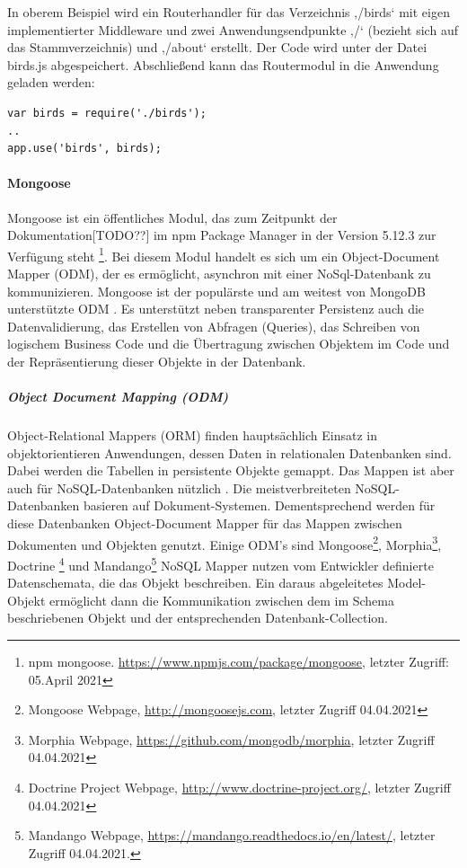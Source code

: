 \noindent
In oberem Beispiel wird ein Routerhandler für das Verzeichnis ‚/birds‘ mit eigen implementierter Middleware und zwei Anwendungsendpunkte ‚/‘ (bezieht sich auf das Stammverzeichnis) und ‚/about‘ erstellt. Der Code wird unter der Datei birds.js abgespeichert. 
Abschließend kann das Routermodul in die Anwendung geladen werden: 
\newline

\begin{lstlisting}[caption=Routinghandler benutzen,label=lst:RoutingHandlerUsage]
var birds = require('./birds');
..
app.use('birds', birds);
\end{lstlisting}

%
%
%

\newpage
\paragraph{Mongoose}
Mongoose ist ein öffentliches Modul, das zum Zeitpunkt der Dokumentation[TODO??] im npm Package Manager in der Version 5.12.3 zur Verfügung steht \footnote{npm mongoose. \url{https://www.npmjs.com/package/mongoose}, letzter Zugriff: 05.April 2021}. Bei diesem Modul handelt es sich um ein Object-Document Mapper (ODM), der es ermöglicht, asynchron mit einer NoSql-Datenbank zu kommunizieren. Mongoose ist der populärste und am weitest von MongoDB unterstützte ODM \cite{Node2.55}. Es unterstützt neben transparenter Persistenz auch die Datenvalidierung, das Erstellen von Abfragen (Queries), das Schreiben von logischem Business Code und die Übertragung zwischen Objektem im Code und der Repräsentierung dieser Objekte in der Datenbank.
\newline

%
%
%

\noindent
\subparagraph{Object Document Mapping (ODM)}
Object-Relational Mappers (ORM) finden haupt\-sächlich Einsatz in objektorientieren Anwendungen, dessen Daten in relationalen Datenbanken sind. Dabei werden die Tabellen in persistente Objekte gemappt.
Das Mappen ist aber auch für NoSQL-Datenbanken nützlich \cite{Node2.56}. Die meistverbreiteten NoSQL-Datenbanken basieren auf Dokument-Systemen. Dementsprechend werden für diese Datenbanken Object-Document Mapper für das Mappen zwischen Dokumenten und Objekten genutzt. Einige ODM’s sind Mongoose\footnote{Mongoose Webpage, \url{http://mongoosejs.com}, letzter Zugriff 04.04.2021}, Morphia\footnote{Morphia Webpage, \url{https://github.com/mongodb/morphia}, letzter Zugriff 04.04.2021}, Doctrine \footnote{Doctrine Project Webpage, \url{http://www.doctrine-project.org/}, letzter Zugriff 04.04.2021} und Mandango\footnote{Mandango Webpage, \url{https://mandango.readthedocs.io/en/latest/}, letzter Zugriff 04.04.2021.}
NoSQL Mapper nutzen vom Entwickler definierte Datenschemata, die das Objekt beschreiben. Ein daraus abgeleitetes Model-Objekt ermöglicht dann die Kommunikation zwischen dem im Schema beschriebenen Objekt und der entsprechenden Datenbank-Collection.
\newline

